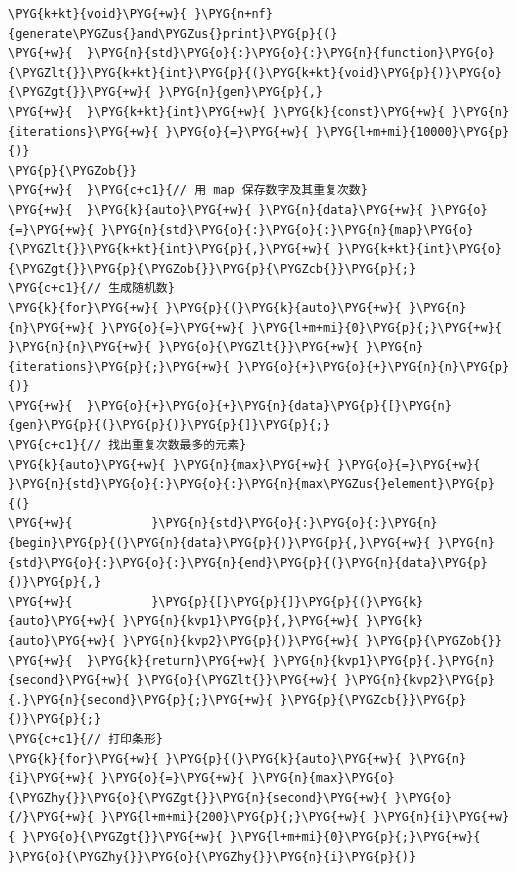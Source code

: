 
\begin{codeblockbg}
\begin{Verbatim}[commandchars=\\\{\},breaklines=true,breakanywhere=true,fontsize=\codefont,xleftmargin=17bp]
\PYG{k+kt}{void}\PYG{+w}{ }\PYG{n+nf}{generate\PYGZus{}and\PYGZus{}print}\PYG{p}{(}
\PYG{+w}{  }\PYG{n}{std}\PYG{o}{:}\PYG{o}{:}\PYG{n}{function}\PYG{o}{\PYGZlt{}}\PYG{k+kt}{int}\PYG{p}{(}\PYG{k+kt}{void}\PYG{p}{)}\PYG{o}{\PYGZgt{}}\PYG{+w}{ }\PYG{n}{gen}\PYG{p}{,}
\PYG{+w}{  }\PYG{k+kt}{int}\PYG{+w}{ }\PYG{k}{const}\PYG{+w}{ }\PYG{n}{iterations}\PYG{+w}{ }\PYG{o}{=}\PYG{+w}{ }\PYG{l+m+mi}{10000}\PYG{p}{)}
\PYG{p}{\PYGZob{}}
\PYG{+w}{  }\PYG{c+c1}{// 用 map 保存数字及其重复次数}
\PYG{+w}{  }\PYG{k}{auto}\PYG{+w}{ }\PYG{n}{data}\PYG{+w}{ }\PYG{o}{=}\PYG{+w}{ }\PYG{n}{std}\PYG{o}{:}\PYG{o}{:}\PYG{n}{map}\PYG{o}{\PYGZlt{}}\PYG{k+kt}{int}\PYG{p}{,}\PYG{+w}{ }\PYG{k+kt}{int}\PYG{o}{\PYGZgt{}}\PYG{p}{\PYGZob{}}\PYG{p}{\PYGZcb{}}\PYG{p}{;}
\PYG{c+c1}{// 生成随机数}
\PYG{k}{for}\PYG{+w}{ }\PYG{p}{(}\PYG{k}{auto}\PYG{+w}{ }\PYG{n}{n}\PYG{+w}{ }\PYG{o}{=}\PYG{+w}{ }\PYG{l+m+mi}{0}\PYG{p}{;}\PYG{+w}{ }\PYG{n}{n}\PYG{+w}{ }\PYG{o}{\PYGZlt{}}\PYG{+w}{ }\PYG{n}{iterations}\PYG{p}{;}\PYG{+w}{ }\PYG{o}{+}\PYG{o}{+}\PYG{n}{n}\PYG{p}{)}
\PYG{+w}{  }\PYG{o}{+}\PYG{o}{+}\PYG{n}{data}\PYG{p}{[}\PYG{n}{gen}\PYG{p}{(}\PYG{p}{)}\PYG{p}{]}\PYG{p}{;}
\PYG{c+c1}{// 找出重复次数最多的元素}
\PYG{k}{auto}\PYG{+w}{ }\PYG{n}{max}\PYG{+w}{ }\PYG{o}{=}\PYG{+w}{ }\PYG{n}{std}\PYG{o}{:}\PYG{o}{:}\PYG{n}{max\PYGZus{}element}\PYG{p}{(}
\PYG{+w}{           }\PYG{n}{std}\PYG{o}{:}\PYG{o}{:}\PYG{n}{begin}\PYG{p}{(}\PYG{n}{data}\PYG{p}{)}\PYG{p}{,}\PYG{+w}{ }\PYG{n}{std}\PYG{o}{:}\PYG{o}{:}\PYG{n}{end}\PYG{p}{(}\PYG{n}{data}\PYG{p}{)}\PYG{p}{,}
\PYG{+w}{           }\PYG{p}{[}\PYG{p}{]}\PYG{p}{(}\PYG{k}{auto}\PYG{+w}{ }\PYG{n}{kvp1}\PYG{p}{,}\PYG{+w}{ }\PYG{k}{auto}\PYG{+w}{ }\PYG{n}{kvp2}\PYG{p}{)}\PYG{+w}{ }\PYG{p}{\PYGZob{}}
\PYG{+w}{  }\PYG{k}{return}\PYG{+w}{ }\PYG{n}{kvp1}\PYG{p}{.}\PYG{n}{second}\PYG{+w}{ }\PYG{o}{\PYGZlt{}}\PYG{+w}{ }\PYG{n}{kvp2}\PYG{p}{.}\PYG{n}{second}\PYG{p}{;}\PYG{+w}{ }\PYG{p}{\PYGZcb{}}\PYG{p}{)}\PYG{p}{;}
\PYG{c+c1}{// 打印条形}
\PYG{k}{for}\PYG{+w}{ }\PYG{p}{(}\PYG{k}{auto}\PYG{+w}{ }\PYG{n}{i}\PYG{+w}{ }\PYG{o}{=}\PYG{+w}{ }\PYG{n}{max}\PYG{o}{\PYGZhy{}}\PYG{o}{\PYGZgt{}}\PYG{n}{second}\PYG{+w}{ }\PYG{o}{/}\PYG{+w}{ }\PYG{l+m+mi}{200}\PYG{p}{;}\PYG{+w}{ }\PYG{n}{i}\PYG{+w}{ }\PYG{o}{\PYGZgt{}}\PYG{+w}{ }\PYG{l+m+mi}{0}\PYG{p}{;}\PYG{+w}{ }\PYG{o}{\PYGZhy{}}\PYG{o}{\PYGZhy{}}\PYG{n}{i}\PYG{p}{)}

\end{Verbatim}
\end{codeblockbg}
